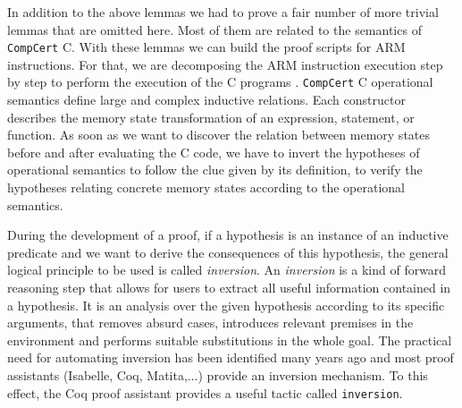 \documentclass[twocolumn]{article}
\newcommand{\coqdockw}[1]{\texttt{#1}}
\newcommand{\inversion}{\coqdockw{inversion}\xspace}
\newcommand{\compcert}{\texttt{CompCert}\xspace}
\begin{document}
In addition to the above lemmas we had to prove a fair number of more
trivial lemmas that are omitted here.  Most of them are related to the
semantics of \compcert C.  With these lemmas we can build the proof
scripts for ARM instructions.  For that, we are decomposing the ARM
instruction execution step by step to perform the execution of
the C programs . \compcert C operational semantics define large and
complex inductive relations. Each constructor describes the
memory state transformation of an expression, statement, or function.
As soon as we want to discover the relation between memory states
before and after evaluating the C code, we have to invert the
hypotheses of operational semantics to follow the clue given by its
definition, to verify the hypotheses relating concrete memory states
according to the operational semantics.

During the development of a proof, if a hypothesis is an instance of
an inductive predicate and we want to derive the consequences of this
hypothesis, the general logical principle to be used is called
\emph{inversion}. An {\em inversion} is a kind of forward reasoning
step that allows for users to extract all useful information contained
in a hypothesis.  It is an analysis over the given hypothesis according
to its specific arguments, that removes absurd cases, introduces
relevant premises in the environment and performs suitable
substitutions in the whole goal.  The practical need for automating
inversion has been identified many years ago and most proof assistants
(Isabelle, Coq, Matita,...)  provide an inversion mechanism.  To this
effect, the Coq proof assistant provides a useful tactic called
\inversion \cite{coqmanual}.
\end{document}
